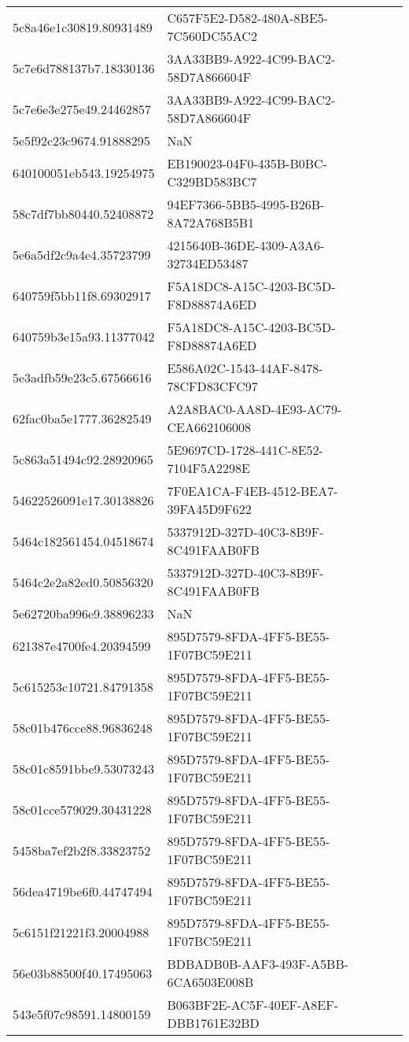 \begin{tabular}{ll}
5c8a46e1c30819.80931489 & C657F5E2-D582-480A-8BE5-7C560DC55AC2 \\
5c7e6d788137b7.18330136 & 3AA33BB9-A922-4C99-BAC2-58D7A866604F \\
5c7e6e3e275e49.24462857 & 3AA33BB9-A922-4C99-BAC2-58D7A866604F \\
5e5f92c23c9674.91888295 & NaN \\
640100051eb543.19254975 & EB190023-04F0-435B-B0BC-C329BD583BC7 \\
58c7df7bb80440.52408872 & 94EF7366-5BB5-4995-B26B-8A72A768B5B1 \\
5e6a5df2c9a4e4.35723799 & 4215640B-36DE-4309-A3A6-32734ED53487 \\
640759f5bb11f8.69302917 & F5A18DC8-A15C-4203-BC5D-F8D88874A6ED \\
640759b3e15a93.11377042 & F5A18DC8-A15C-4203-BC5D-F8D88874A6ED \\
5e3adfb59e23c5.67566616 & E586A02C-1543-44AF-8478-78CFD83CFC97 \\
62fac0ba5e1777.36282549 & A2A8BAC0-AA8D-4E93-AC79-CEA662106008 \\
5c863a51494c92.28920965 & 5E9697CD-1728-441C-8E52-7104F5A2298E \\
54622526091e17.30138826 & 7F0EA1CA-F4EB-4512-BEA7-39FA45D9F622 \\
5464c182561454.04518674 & 5337912D-327D-40C3-8B9F-8C491FAAB0FB \\
5464c2e2a82ed0.50856320 & 5337912D-327D-40C3-8B9F-8C491FAAB0FB \\
5e62720ba996e9.38896233 & NaN \\
621387e4700fe4.20394599 & 895D7579-8FDA-4FF5-BE55-1F07BC59E211 \\
5c615253c10721.84791358 & 895D7579-8FDA-4FF5-BE55-1F07BC59E211 \\
58c01b476cce88.96836248 & 895D7579-8FDA-4FF5-BE55-1F07BC59E211 \\
58c01c8591bbe9.53073243 & 895D7579-8FDA-4FF5-BE55-1F07BC59E211 \\
58c01cce579029.30431228 & 895D7579-8FDA-4FF5-BE55-1F07BC59E211 \\
5458ba7ef2b2f8.33823752 & 895D7579-8FDA-4FF5-BE55-1F07BC59E211 \\
56dea4719be6f0.44747494 & 895D7579-8FDA-4FF5-BE55-1F07BC59E211 \\
5c6151f21221f3.20004988 & 895D7579-8FDA-4FF5-BE55-1F07BC59E211 \\
56e03b88500f40.17495063 & BDBADB0B-AAF3-493F-A5BB-6CA6503E008B \\
543e5f07c98591.14800159 & B063BF2E-AC5F-40EF-A8EF-DBB1761E32BD \\

\end{tabular}
